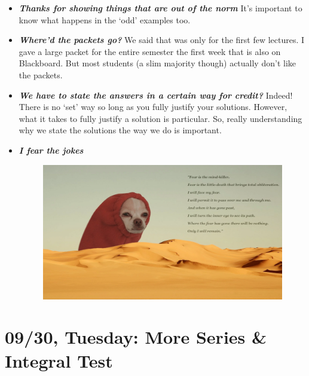\documentclass[11pt,letterpaper]{article}
\begin{document}
\begin{itemize}
\item {\bfseries\itshape Thanks for showing things that are out of the norm} It's important to know what happens in the `odd' examples too. 

\item {\bfseries\itshape Where'd the packets go?} We said that was only for the first few lectures. I gave a large packet for the entire semester the first week that is also on Blackboard. But most students (a slim majority though) actually don't like the packets.

\item {\bfseries\itshape We have to state the answers in a certain way for credit?} Indeed! There is no `set' way so long as you fully justify your solutions. However, what it takes to fully justify a solution is particular. So, really understanding why we state the solutions the way we do is important. 

\item {\bfseries\itshape I fear the jokes} 
	\begin{figure}[H]
	\centering
	\includegraphics[width=\textwidth]{images/fear.png}
	\end{figure}
\end{itemize}

\newpage
\section*{09/30, Tuesday: More Series \& Integral Test\label{09-30}}
\end{document}
